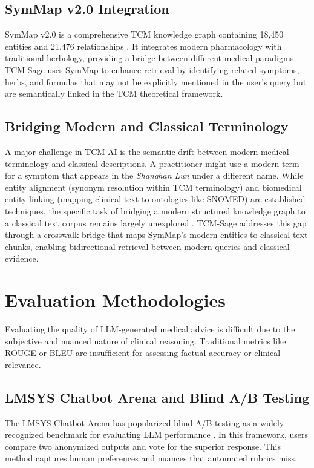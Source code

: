 \subsection{SymMap v2.0 Integration}

SymMap v2.0 is a comprehensive TCM knowledge graph containing 18,450 entities and 21,476 relationships \cite{symmap2020}. It integrates modern pharmacology with traditional herbology, providing a bridge between different medical paradigms. TCM-Sage uses SymMap to enhance retrieval by identifying related symptoms, herbs, and formulas that may not be explicitly mentioned in the user's query but are semantically linked in the TCM theoretical framework.

\subsection{Bridging Modern and Classical Terminology}

A major challenge in TCM AI is the semantic drift between modern medical terminology and classical descriptions. A practitioner might use a modern term for a symptom that appears in the \textit{Shanghan Lun} under a different name. While entity alignment (synonym resolution within TCM terminology) and biomedical entity linking (mapping clinical text to ontologies like SNOMED) are established techniques, the specific task of bridging a modern structured knowledge graph to a classical text corpus remains largely unexplored \cite{xiang2025kgtcm}. TCM-Sage addresses this gap through a crosswalk bridge that maps SymMap's modern entities to classical text chunks, enabling bidirectional retrieval between modern queries and classical evidence.

\section{Evaluation Methodologies}

Evaluating the quality of LLM-generated medical advice is difficult due to the subjective and nuanced nature of clinical reasoning. Traditional metrics like ROUGE or BLEU are insufficient for assessing factual accuracy or clinical relevance.

\subsection{LMSYS Chatbot Arena and Blind A/B Testing}

The LMSYS Chatbot Arena has popularized blind A/B testing as a widely recognized benchmark for evaluating LLM performance \cite{chatbotarena2024}. In this framework, users compare two anonymized outputs and vote for the superior response. This method captures human preferences and nuances that automated rubrics miss.

